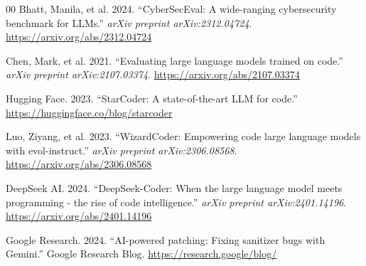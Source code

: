 \documentclass[conference]{IEEEtran}
\begin{document}
\begin{thebibliography}{00}
Bhatt, Manila, et al. 2024. ``CyberSecEval: A wide-ranging cybersecurity benchmark for LLMs.'' \textit{arXiv preprint arXiv:2312.04724}. \url{https://arxiv.org/abs/2312.04724}

Chen, Mark, et al. 2021. ``Evaluating large language models trained on code.'' \textit{arXiv preprint arXiv:2107.03374}. \url{https://arxiv.org/abs/2107.03374}

Hugging Face. 2023. ``StarCoder: A state-of-the-art LLM for code.'' \url{https://huggingface.co/blog/starcoder}

Luo, Ziyang, et al. 2023. ``WizardCoder: Empowering code large language models with evol-instruct.'' \textit{arXiv preprint arXiv:2306.08568}. \url{https://arxiv.org/abs/2306.08568}

DeepSeek AI. 2024. ``DeepSeek-Coder: When the large language model meets programming - the rise of code intelligence.'' \textit{arXiv preprint arXiv:2401.14196}. \url{https://arxiv.org/abs/2401.14196}

Google Research. 2024. ``AI-powered patching: Fixing sanitizer bugs with Gemini.'' Google Research Blog. \url{https://research.google/blog/}

\end{thebibliography}
\end{document}
